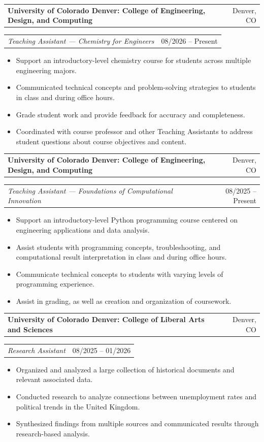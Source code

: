 \documentclass[10pt]{article}
\makeatletter
\newcommand{\companyLine}[2]{
\noindent
\begin{tabular*}{\textwidth}{@{\extracolsep{\fill}} l r}
\textbf{#1} & #2 \\
\end{tabular*}
}
\newcommand{\roleLine}[2]{
\noindent
\begin{tabular*}{\textwidth}{@{\extracolsep{\fill}} l r}
\textit{#1} & #2 \\
\end{tabular*}
}
\makeatother
\begin{document}
\companyLine{University of Colorado Denver: College of Engineering, Design, and Computing}{Denver, CO}
\roleLine{Teaching Assistant --- Chemistry for Engineers}{08/2026 -- Present}
\begin{itemize}
\item Support an introductory-level chemistry course for students across multiple engineering majors.
\item Communicated technical concepts and problem-solving strategies to students in class and during office hours.
\item Grade student work and provide feedback for accuracy and completeness.
\item Coordinated with course professor and other Teaching Assistants to address student questions about course objectives and content.
\end{itemize}

\vspace{.2em}

\companyLine{University of Colorado Denver: College of Engineering, Design, and Computing}{Denver, CO}
\roleLine{Teaching Assistant --- Foundations of Computational Innovation}{08/2025 -- Present}
\begin{itemize}
\item Support an introductory-level Python programming course centered on engineering applications and data analysis.
\item Assist students with programming concepts, troubleshooting, and computational result interpretation in class and during office hours.
\item Communicate technical concepts to students with varying levels of programming experience.
\item Assist in grading, as well as creation and organization of coursework.
\end{itemize}

\vspace{.2em}

\companyLine{University of Colorado Denver: College of Liberal Arts and Sciences}{Denver, CO}
\roleLine{Research Assistant}{08/2025 -- 01/2026}
\begin{itemize}
\item Organized and analyzed a large collection of historical documents and relevant associated data.
\item Conducted research to analyze connections between unemployment rates and political trends in the United Kingdom.
\item Synthesized findings from multiple sources and communicated results through research-based analysis.
\end{itemize}
\end{document}
